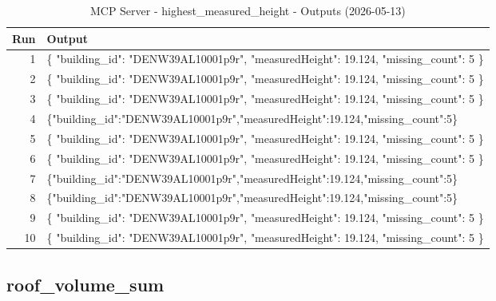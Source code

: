 \documentclass[a4paper,11pt]{article}
\begin{document}
\begin{table}[ht]
\centering
\scriptsize
\caption{MCP Server - highest\_measured\_height - Outputs (2026-05-13)}
\label{tab:mcp\_highest\_measured\_height\_outputs\_2026-05-13}
\begin{tabular}{r p{12cm}}
\hline
Run & Output \\
\hline
1 & \{
  "building\_id": "DENW39AL10001p9r",
  "measuredHeight": 19.124,
  "missing\_count": 5
\} \\
2 & \{
  "building\_id": "DENW39AL10001p9r",
  "measuredHeight": 19.124,
  "missing\_count": 5
\} \\
3 & \{
  "building\_id": "DENW39AL10001p9r",
  "measuredHeight": 19.124,
  "missing\_count": 5
\} \\
4 & \{"building\_id":"DENW39AL10001p9r","measuredHeight":19.124,"missing\_count":5\} \\
5 & \{
  "building\_id": "DENW39AL10001p9r",
  "measuredHeight": 19.124,
  "missing\_count": 5
\} \\
6 & \{
  "building\_id": "DENW39AL10001p9r",
  "measuredHeight": 19.124,
  "missing\_count": 5
\} \\
7 & \{"building\_id":"DENW39AL10001p9r","measuredHeight":19.124,"missing\_count":5\} \\
8 & \{"building\_id":"DENW39AL10001p9r","measuredHeight":19.124,"missing\_count":5\} \\
9 & \{
  "building\_id": "DENW39AL10001p9r",
  "measuredHeight": 19.124,
  "missing\_count": 5
\} \\
10 & \{
  "building\_id": "DENW39AL10001p9r",
  "measuredHeight": 19.124,
  "missing\_count": 5
\} \\
\hline
\end{tabular}
\end{table}

\clearpage
\subsection{roof\_volume\_sum}
\end{document}
